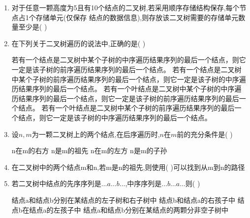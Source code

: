 \documentclass[12pt, a4paper, oneside, UTF8]{ctexbook}
\begin{document}
\begin{enumerate}
    \item \bl 对于任意一颗高度为5且有10个结点的二叉树,若采用顺序存储结构保存,每个节点占1个存储单元(仅保存
    结点的数据信息),则存放该二叉树需要的存储单元数量至少是(     ) 

    \item 在下列关于二叉树遍历的说法中,正确的是(     ) 
    \begin{choices}[1]
    \task 若有一个结点是二叉树中某个子树的中序遍历结果序列的最后一个结点，则它一定是该子树的前序遍历结果序列的最后一个结点。
    \task 若有一个结点是二叉树中某个子树的前序遍历结果序列的最后一个结点，则它一定是该子树的中序遍历结果序列的最后一个结点。
    \task 若有一个叶结点是二叉树中某个子树的中序遍历结果序列的最后一个结点，则它一定是该子树的前序遍历结果序列的最后一个结点。
    \task 若有一个叶结点是二叉树中某个子树的前序遍历结果序列的最后一个结点，则它一定是该子树的中序遍历结果序列的最后一个结点。
    \end{choices} 

    \item 设$n,m$为一颗二叉树上的两个结点,在后序遍历时,$n$在$m$前的充分条件是(    ) 
    \begin{choices}
        \task n在m的右方 
        \task n是m的祖先
        \task n在m的左方
        \task n是m的子孙 
    \end{choices}

    \item 在二叉树中的两个结点m和n,若m是n的祖先,则使用(    )可以找到从m到n的路径 
    
    \item 若二叉树中结点的先序序列是$\ldots a\ldots b\ldots$,中序序列是$\ldots b\ldots a\ldots$则(    ) 
    \begin{choices}[1]
        \task 结点a和结点b分别在某结点的左子树和右子树中
        \task 结点b和结点a的右孩子中
        \task 结点b在结点a的左孩子中
        \task 结点a和结点b分别在某结点的两颗分非空子树中 
    \end{choices}


\end{enumerate}
\end{document}
